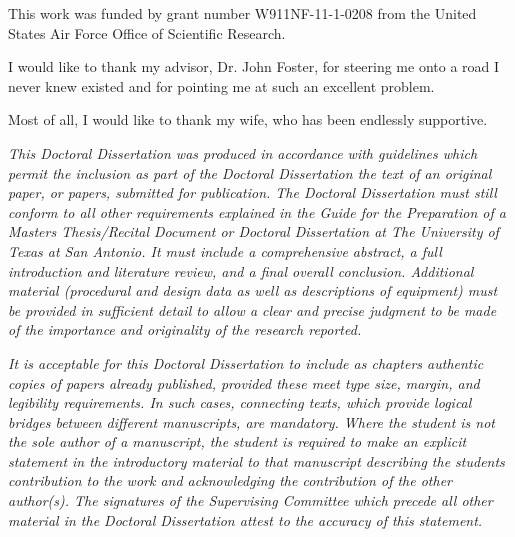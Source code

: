 \author{James O'Grady}
\maketitle
\begin{acknowledgements}
This work was funded by grant number W911NF-11-1-0208 from the United States Air Force Office of Scientific Research. 

I would like to thank my advisor, Dr. John Foster, for steering me onto a road I never knew existed and for pointing me at such an excellent problem.

Most of all, I would like to thank my wife, who has been endlessly supportive.


\begin{singlespace}
\emph{This Doctoral Dissertation
was produced in accordance with guidelines which permit the inclusion as part of the Doctoral Dissertation the text of an original paper, or papers, submitted for publication.
The Doctoral Dissertation must still conform to all other requirements explained in the Guide for the Preparation of a Masters Thesis/Recital Document or Doctoral Dissertation at The University of Texas at San Antonio. 
It must include a comprehensive abstract, a full introduction and literature review, and a final overall conclusion. 
Additional material (procedural and design data as well as descriptions of equipment) must be provided in sufficient detail to allow a clear and precise judgment to be made of the importance and originality of the research reported. }

\emph{It is acceptable for this 
Doctoral Dissertation to include as chapters authentic copies of papers already published, provided these meet type size, margin, and legibility
requirements. 
In such cases, connecting texts, which provide logical bridges between different manuscripts, are mandatory. 
Where the student is not the sole author of a manuscript, the student is required to make an explicit statement in the introductory material to that manuscript describing the students contribution to the work and acknowledging the contribution of the other author(s). 
The signatures of the Supervising Committee which precede all other material in the Doctoral Dissertation attest to the accuracy of this statement.}\end{singlespace}
\end{acknowledgements}

